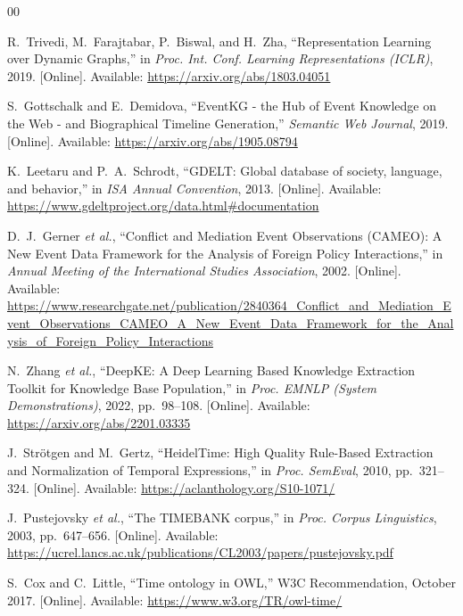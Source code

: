 \documentclass[conference]{IEEEtran}
\begin{document}
\balance
\begin{thebibliography}{00}

R.~Trivedi, M.~Farajtabar, P.~Biswal, and H.~Zha,
``Representation Learning over Dynamic Graphs,''
in \textit{Proc. Int. Conf. Learning Representations (ICLR)}, 2019.
[Online]. Available: \url{https://arxiv.org/abs/1803.04051}

S.~Gottschalk and E.~Demidova,
``EventKG - the Hub of Event Knowledge on the Web - and Biographical Timeline Generation,''
\textit{Semantic Web Journal}, 2019.
[Online]. Available: \url{https://arxiv.org/abs/1905.08794}

K.~Leetaru and P.~A.~Schrodt,
``GDELT: Global database of society, language, and behavior,''
in \textit{ISA Annual Convention}, 2013.
[Online]. Available: \url{https://www.gdeltproject.org/data.html#documentation}

D.~J.~Gerner \textit{et al.},
``Conflict and Mediation Event Observations (CAMEO): A New Event Data Framework for the Analysis of Foreign Policy Interactions,''
in \textit{Annual Meeting of the International Studies Association}, 2002.
[Online]. Available: \url{https://www.researchgate.net/publication/2840364_Conflict_and_Mediation_Event_Observations_CAMEO_A_New_Event_Data_Framework_for_the_Analysis_of_Foreign_Policy_Interactions}

N.~Zhang \textit{et al.},
``DeepKE: A Deep Learning Based Knowledge Extraction Toolkit for Knowledge Base Population,''
in \textit{Proc. EMNLP (System Demonstrations)}, 2022, pp.~98--108.
[Online]. Available: \url{https://arxiv.org/abs/2201.03335}

J.~Str\"{o}tgen and M.~Gertz,
``HeidelTime: High Quality Rule-Based Extraction and Normalization of Temporal Expressions,''
in \textit{Proc. SemEval}, 2010, pp.~321--324.
[Online]. Available: \url{https://aclanthology.org/S10-1071/}

J.~Pustejovsky \textit{et al.},
``The TIMEBANK corpus,''
in \textit{Proc. Corpus Linguistics}, 2003, pp.~647--656.
[Online]. Available: \url{https://ucrel.lancs.ac.uk/publications/CL2003/papers/pustejovsky.pdf}

S.~Cox and C.~Little,
``Time ontology in OWL,'' W3C Recommendation, October 2017.
[Online]. Available: \url{https://www.w3.org/TR/owl-time/}


\end{thebibliography}
\end{document}
